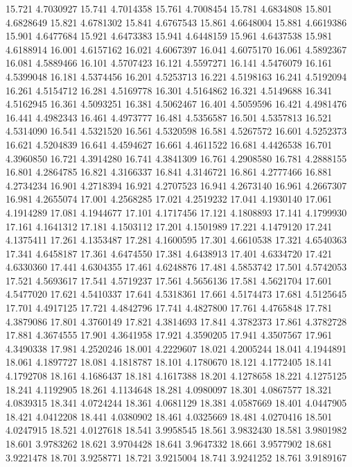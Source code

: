 15.721 4.7030927
15.741 4.7014358
15.761 4.7008454
15.781 4.6834808
15.801 4.6828649
15.821 4.6781302
15.841 4.6767543
15.861 4.6648004
15.881 4.6619386
15.901 4.6477684
15.921 4.6473383
15.941 4.6448159
15.961 4.6437538
15.981 4.6188914
16.001 4.6157162
16.021 4.6067397
16.041 4.6075170
16.061 4.5892367
16.081 4.5889466
16.101 4.5707423
16.121 4.5597271
16.141 4.5476079
16.161 4.5399048
16.181 4.5374456
16.201 4.5253713
16.221 4.5198163
16.241 4.5192094
16.261 4.5154712
16.281 4.5169778
16.301 4.5164862
16.321 4.5149688
16.341 4.5162945
16.361 4.5093251
16.381 4.5062467
16.401 4.5059596
16.421 4.4981476
16.441 4.4982343
16.461 4.4973777
16.481 4.5356587
16.501 4.5357813
16.521 4.5314090
16.541 4.5321520
16.561 4.5320598
16.581 4.5267572
16.601 4.5252373
16.621 4.5204839
16.641 4.4594627
16.661 4.4611522
16.681 4.4426538
16.701 4.3960850
16.721 4.3914280
16.741 4.3841309
16.761 4.2908580
16.781 4.2888155
16.801 4.2864785
16.821 4.3166337
16.841 4.3146721
16.861 4.2777466
16.881 4.2734234
16.901 4.2718394
16.921 4.2707523
16.941 4.2673140
16.961 4.2667307
16.981 4.2655074
17.001 4.2568285
17.021 4.2519232
17.041 4.1930140
17.061 4.1914289
17.081 4.1944677
17.101 4.1717456
17.121 4.1808893
17.141 4.1799930
17.161 4.1641312
17.181 4.1503112
17.201 4.1501989
17.221 4.1479120
17.241 4.1375411
17.261 4.1353487
17.281 4.1600595
17.301 4.6610538
17.321 4.6540363
17.341 4.6458187
17.361 4.6474550
17.381 4.6438913
17.401 4.6334720
17.421 4.6330360
17.441 4.6304355
17.461 4.6248876
17.481 4.5853742
17.501 4.5742053
17.521 4.5693617
17.541 4.5719237
17.561 4.5656136
17.581 4.5621704
17.601 4.5477020
17.621 4.5410337
17.641 4.5318361
17.661 4.5174473
17.681 4.5125645
17.701 4.4917125
17.721 4.4842796
17.741 4.4827800
17.761 4.4765848
17.781 4.3879086
17.801 4.3760149
17.821 4.3814693
17.841 4.3782373
17.861 4.3782728
17.881 4.3674555
17.901 4.3641958
17.921 4.3590205
17.941 4.3507567
17.961 4.3490338
17.981 4.2520246
18.001 4.2229607
18.021 4.2005244
18.041 4.1944891
18.061 4.1897727
18.081 4.1818787
18.101 4.1780670
18.121 4.1772405
18.141 4.1792708
18.161 4.1686437
18.181 4.1617388
18.201 4.1278658
18.221 4.1275125
18.241 4.1192905
18.261 4.1134648
18.281 4.0980097
18.301 4.0867577
18.321 4.0839315
18.341 4.0724244
18.361 4.0681129
18.381 4.0587669
18.401 4.0447905
18.421 4.0412208
18.441 4.0380902
18.461 4.0325669
18.481 4.0270416
18.501 4.0247915
18.521 4.0127618
18.541 3.9958545
18.561 3.9832430
18.581 3.9801982
18.601 3.9783262
18.621 3.9704428
18.641 3.9647332
18.661 3.9577902
18.681 3.9221478
18.701 3.9258771
18.721 3.9215004
18.741 3.9241252
18.761 3.9189167
